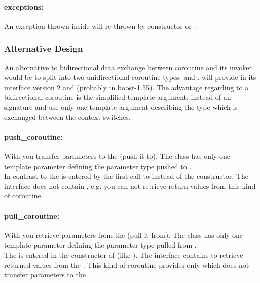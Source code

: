 \paragraph*{exceptions:}
An exception thrown inside \corofunction will re-thrown by \coro constructor or
\coroop.


\subsubsection*{Alternative Design}
An alternative to bidirectional data exchange between coroutine and its invoker
would be to split \coro into two unidirectional coroutine types: \pushcoro and
\pullcoro. \boostcoroutine will provide in its interface version 2 \pushcoro and
\pullcoro (probably in boost-1.55). The advantage regarding to a bidirectional
coroutine is the simplified template argument; instead of an signature
\pullcoro and \pushcoro use only one template argument describing the type
which is exchanged between the context switches.

\paragraph*{push\_coroutine:}
With \pushcoro you transfer parameters to the \corofunction (push it to). The
class has only one template parameter defining the parameter type pushed to
\corofunction.\\
\newline
In contrast to \coro the \corofunction is entered by the first call to
\pushcoroop instead of the constructor. The interface does not contain
\coroget, e.g. you can not retrieve return values from this kind of coroutine.

\paragraph*{pull\_coroutine:}
With \pullcoro you retrieve parameters from the \corofunction (pull it from).
The class has only one template parameter defining the parameter type pulled
from \corofunction.\\
\newline
The \corofunction is entered in the constructor of \corofunction (like \coro).
The interface contains \coroget to retrieve returned values from the
\corofunction.  This kind of coroutine provides only \pullcoroop which
does not transfer parameters to the \corofunction.

